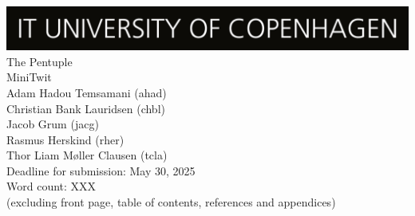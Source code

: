 \begin{titlepage}      
    \begin{center}
        \includegraphics[width=\textwidth]{images/ITU_logo.jpg}\\[1.5cm]
      
        \huge {             
            The Pentuple \\ MiniTwit
        }\\
        \vspace{2cm}
        {\Large
            Adam Hadou Temsamani (ahad) 
        }\\
        {\Large
            Christian Bank Lauridsen (chbl)
        }\\
        {\Large
            Jacob Grum (jacg) 
        }\\
        {\Large
            Rasmus Herskind (rher)  
        }\\
        {\Large
            Thor Liam Møller Clausen (tcla)  
        }\\
        \vspace{2cm}
        {\Large
            Deadline for submission: May 30, 2025
        }\\
        \vspace{2cm} 
        {\large 
            Word count: XXX \\ (excluding front page, table of contents, references and appendices)
        } 
    \end{center} 
\end{titlepage}